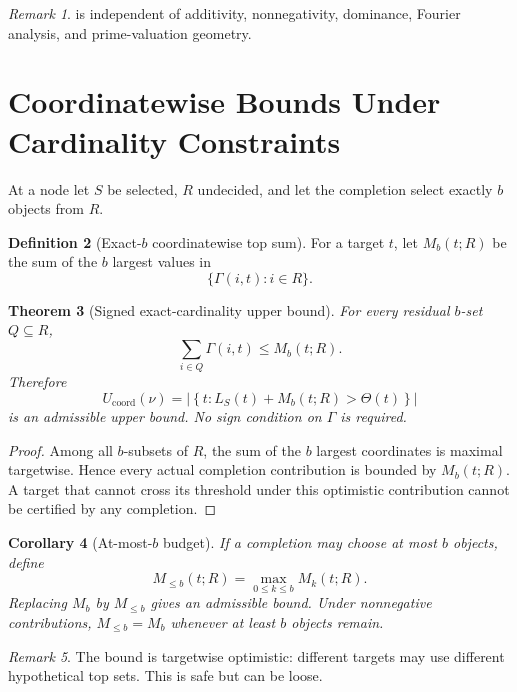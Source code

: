 \documentclass[11pt]{article}
\newtheorem{theorem}{Theorem}[section]
\newtheorem{corollary}[theorem]{Corollary}
\theoremstyle{definition}
\newtheorem{definition}[theorem]{Definition}
\theoremstyle{remark}
\newtheorem{remark}[theorem]{Remark}
\begin{document}
\begin{remark}
 is independent of additivity, nonnegativity, dominance, Fourier analysis, and prime-valuation geometry.
\end{remark}

\section{Coordinatewise Bounds Under Cardinality Constraints}

At a node let $S$ be selected, $R$ undecided, and let the completion select exactly $b$ objects from $R$.

\begin{definition}[Exact-$b$ coordinatewise top sum]\label{def:top-b}
For a target $t$, let $M_b(t;R)$ be the sum of the $b$ largest values in
\[
\{\Gamma(i,t):i\in R\}.
\]
\end{definition}

\begin{theorem}[Signed exact-cardinality upper bound]\label{thm:signed-top-b}
For every residual $b$-set $Q\subseteq R$,
\[
\sum_{i\in Q}\Gamma(i,t)\le M_b(t;R).
\]
Therefore
\[
U_{\mathrm{coord}}(\nu)
=
\left|
\left\{
 t:
 L_S(t)+M_b(t;R)>\Theta(t)
\right\}
\right|
\]
is an admissible upper bound. No sign condition on $\Gamma$ is required.
\end{theorem}

\begin{proof}
Among all $b$-subsets of $R$, the sum of the $b$ largest coordinates is maximal targetwise. Hence every actual completion contribution is bounded by $M_b(t;R)$. A target that cannot cross its threshold under this optimistic contribution cannot be certified by any completion.
\end{proof}

\begin{corollary}[At-most-$b$ budget]\label{cor:at-most-b}
If a completion may choose at most $b$ objects, define
\[
M_{\le b}(t;R)=\max_{0\le k\le b}M_k(t;R).
\]
Replacing $M_b$ by $M_{\le b}$ gives an admissible bound. Under nonnegative contributions, $M_{\le b}=M_b$ whenever at least $b$ objects remain.
\end{corollary}

\begin{remark}
The bound is targetwise optimistic: different targets may use different hypothetical top sets. This is safe but can be loose.
\end{remark}
\end{document}

